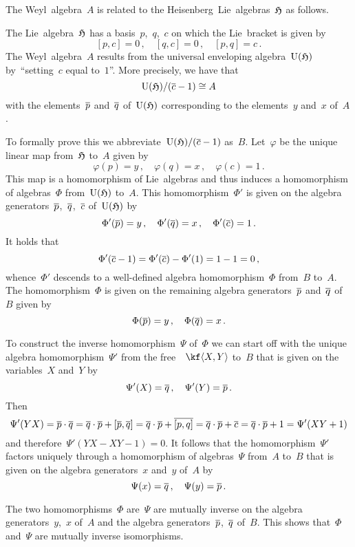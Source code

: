\begin{remark}
	The Weyl~algebra~$A$ is related to the {\threedimensional} Heisenberg~Lie~algebras~$\mathfrak{H}$ as follows.

	The Lie~algebra~$\mathfrak{H}$ has a basis~$p$,~$q$,~$c$ on which the Lie~bracket is given by
	\[
		[p,c] = 0 \,,
		\quad
		[q,c] = 0 \,,
		\quad
		[p,q] = c \,.
	\]
	The Weyl~algebra~$A$ results from the universal enveloping algebra~$\operatorname{U}(\mathfrak{H})$ by~\enquote{setting~$c$ equal to~$1$}.
	More precisely, we have that
	\[
		\operatorname{U}(\mathfrak{H}) / \lparen \overline{c} - 1 \rparen
		\cong
		A
	\]
	with the elements~$\overline{p}$ and~$\overline{q}$ of~$\operatorname{U}(\mathfrak{H})$ corresponding to the elements~$y$ and~$x$ of~$A$.

	To formally prove this we abbreviate~$\operatorname{U}(\mathfrak{H})/(\overline{c} - 1)$ as~$B$.	
	Let~$\varphi$ be the unique linear map from~$\mathfrak{H}$ to~$A$ given by
	\[
		\varphi(p) = y \,,
		\quad
		\varphi(q) = x \,,
		\quad
		\varphi(c)  =1 \,.
	\]
	This map is a homomorphism of Lie~algebras and thus induces a homomorphism of algebras~$\Phi$ from~$\operatorname{U}(\mathfrak{H})$ to~$A$.
	This homomorphism~$\Phi'$ is given on the algebra generators~$\overline{p}$,~$\overline{q}$,~$\overline{c}$ of~$\operatorname{U}(\mathfrak{H})$ by
	\[
		\Phi'( \overline{p} ) = y \,,
		\quad
		\Phi'( \overline{q} ) = x \,,
		\quad
		\Phi'( \overline{c} ) = 1 \,.
	\]
	It holds that
	\[
		\Phi'(\overline{c} - 1)
		=
		\Phi'(\overline{c}) - \Phi'(1)
		=
		1 - 1
		=
		0 \,,
	\]
	whence~$\Phi'$ descends to a well-defined algebra homomorphism~$\Phi$ from~$B$ to~$A$.
	The homomorphism~$\Phi$ is given on the remaining algebra generators~$\overline{p}$ and~$\overline{q}$ of~$B$ given by
	\[
		\Phi(\overline{p}) = y \,,
		\quad
		\Phi(\overline{q}) = x \,.
	\]
	
	To construct the inverse homomorphism~$\Psi$ of~$\Phi$ we can start off with the unique algebra homomorphism~$\Psi'$ from the free~\algebra{$\kf$}~$\kf\gen{X,Y}$ to~$B$ that is given on the variables~$X$ and~$Y$ by
	\[
		\Psi'(X) = \overline{q} \,,
		\quad
		\Psi'(Y) = \overline{p} \,.
	\]
	Then
	\[
		\Psi'(YX)
		=
		\overline{p} \cdot \overline{q}
		=
		\overline{q} \cdot \overline{p}
		+
		[ \overline{p}, \overline{q} ]
		=
		\overline{q} \cdot \overline{p} + \overline{[p,q]}
		=
		\overline{q} \cdot \overline{p} + \overline{c}
		=
		\overline{q} \cdot \overline{p} + 1
		=
		\Psi'(XY + 1)
	\]
	and therefore~$\Psi'(YX - XY - 1) = 0$.
	It follows that the homomorphism~$\Psi'$ factors uniquely through a homomorphism of algebras~$\Psi$ from~$A$ to~$B$ that is given on the algebra generators~$x$ and~$y$ of~$A$ by
	\[
		\Psi(x) = \overline{q} \,,
		\quad
		\Psi(y) = \overline{p} \,.
	\]
	
	The two homomorphisms~$\Phi$ are~$\Psi$ are mutually inverse on the algebra generators~$y$,~$x$ of~$A$ and the algebra generators~$\overline{p}$,~$\overline{q}$ of~$B$.
	This shows that~$\Phi$ and~$\Psi$ are mutually inverse isomorphisms.
\end{remark}



